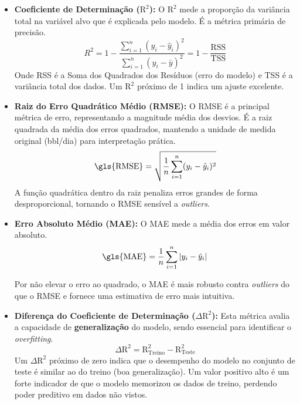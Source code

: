 \begin{itemize}
    \item \textbf{Coeficiente de Determinação ($\text{R}^2$):} O $\text{R}^2$ mede a proporção da variância total na variável alvo que é explicada pelo modelo. É a métrica primária de precisão.
    \begin{equation}
        R^2 = 1 - \frac{\sum_{i=1}^{n} (y_i - \hat{y}_i)^2}{\sum_{i=1}^{n} (y_i - \bar{y})^2} = 1 - \frac{\text{RSS}}{\text{TSS}}
    \end{equation}
    Onde \gls{RSS} é a Soma dos Quadrados dos Resíduos (erro do modelo) e \gls{TSS} é a variância total dos dados. Um $\text{R}^2$ próximo de 1 indica um ajuste excelente.
    
    \item \textbf{Raiz do Erro Quadrático Médio (RMSE):} O \gls{RMSE} é a principal métrica de erro, representando a magnitude média dos desvios. É a raiz quadrada da média dos erros quadrados, mantendo a unidade de medida original (bbl/dia) para interpretação prática.
    \begin{equation}
        \text{\gls{RMSE}} = \sqrt{\frac{1}{n} \sum_{i=1}^{n} (y_i - \hat{y}_i)^2}
    \end{equation}
    A função quadrática dentro da raiz penaliza erros grandes de forma desproporcional, tornando o \gls{RMSE} sensível a \textit{outliers}.

    \item \textbf{Erro Absoluto Médio (MAE):} O \gls{MAE} mede a média dos erros em valor absoluto.
    \begin{equation}
         \text{\gls{MAE}} = \frac{1}{n} \sum_{i=1}^{n} |y_i - \hat{y}_i|
    \end{equation}
    
    Por não elevar o erro ao quadrado, o MAE é mais robusto contra \textit{outliers} do que o \gls{RMSE} e fornece uma estimativa de erro mais intuitiva.

    \item \textbf{Diferença do Coeficiente de Determinação ($\Delta \text{R}^2$):} Esta métrica avalia a capacidade de \textbf{generalização} do modelo, sendo essencial para identificar o \textit{overfitting}.
    \begin{equation}
        \Delta \text{R}^2 = \text{R}^2_{\text{Treino}} - \text{R}^2_{\text{Teste}}
    \end{equation}
    Um $\Delta \text{R}^2$ próximo de zero indica que o desempenho do modelo no conjunto de teste é similar ao do treino (boa generalização). Um valor positivo alto é um forte indicador de que o modelo memorizou os dados de treino, perdendo poder preditivo em dados não vistos.
\end{itemize}